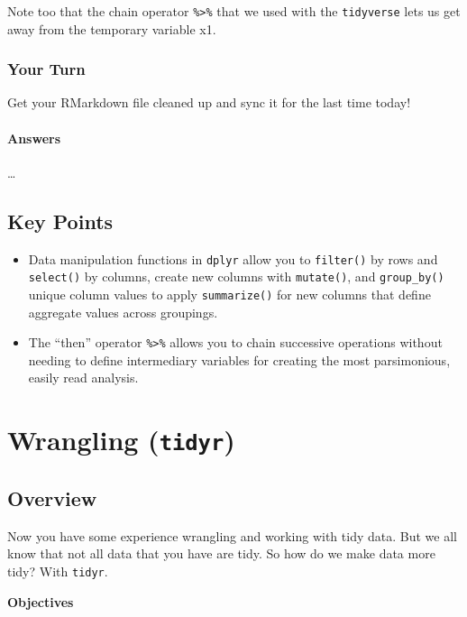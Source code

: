 \documentclass[]{book}
\providecommand{\tightlist}{%
  \setlength{\itemsep}{0pt}\setlength{\parskip}{0pt}}
\theoremstyle{definition}
\theoremstyle{definition}
\theoremstyle{definition}
\theoremstyle{remark}
\begin{document}
Note too that the chain operator \texttt{\%\textgreater{}\%} that we
used with the \texttt{tidyverse} lets us get away from the temporary
variable x1.

\subsection{Your Turn}\label{your-turn-10}

Get your RMarkdown file cleaned up and sync it for the last time today!

\subsubsection{Answers}\label{answers}

\ldots{}

\section{Key Points}\label{key-points}

\begin{itemize}
\tightlist
\item
  Data manipulation functions in \texttt{dplyr} allow you to
  \texttt{filter()} by rows and \texttt{select()} by columns, create new
  columns with \texttt{mutate()}, and \texttt{group\_by()} unique column
  values to apply \texttt{summarize()} for new columns that define
  aggregate values across groupings.
\item
  The ``then'' operator \texttt{\%\textgreater{}\%} allows you to chain
  successive operations without needing to define intermediary variables
  for creating the most parsimonious, easily read analysis.
\end{itemize}

\chapter{\texorpdfstring{Wrangling
(\texttt{tidyr})}{Wrangling (tidyr)}}\label{tidyr}

\section{Overview}\label{overview-1}

Now you have some experience wrangling and working with tidy data. But
we all know that not all data that you have are tidy. So how do we make
data more tidy? With \texttt{tidyr}.

\textbf{Objectives}
\end{document}
